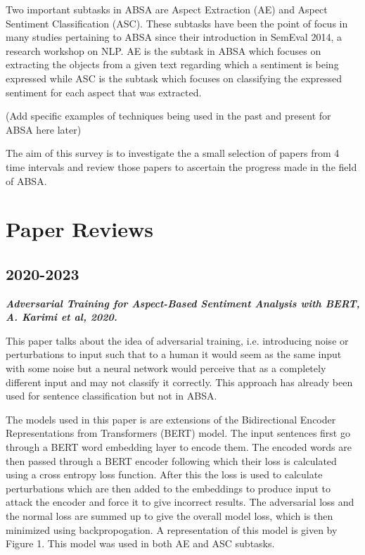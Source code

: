 \documentclass[conference]{IEEEtran}
\begin{document}
Two important subtasks in ABSA are Aspect Extraction (AE) and Aspect Sentiment Classification (ASC). These subtasks have been the point of focus in many studies pertaining to ABSA since their introduction in SemEval 2014, a research workshop on NLP. AE is the subtask in ABSA which focuses on extracting the objects from a given text regarding which a sentiment is being expressed while ASC is the subtask which focuses on classifying the expressed sentiment for each aspect that was extracted.

(Add specific examples of techniques being used in the past and present for ABSA here later)

The aim of this survey is to investigate the a small selection of papers from 4 time intervals and review those papers to ascertain the progress made in the field of ABSA.

\section{Paper Reviews}

\subsection{2020-2023}

\textit{\textbf{Adversarial Training for Aspect-Based Sentiment
Analysis with BERT, A. Karimi et al, 2020.}}

This paper talks about the idea of adversarial training, i.e. introducing noise or perturbations to input such that to a human it would seem as the same input with some noise but a neural network would perceive that as a completely different input and may not classify it correctly. This approach has already been used for sentence classification but not in ABSA.

The models used in this paper is are extensions of the Bidirectional Encoder Representations from Transformers (BERT) model. The input sentences first go through a BERT word embedding layer to encode them. The encoded words are then passed through a BERT encoder following which their loss is calculated using a cross entropy loss function. After this the loss is used to calculate perturbations which are then added to the embeddings to produce input to attack the encoder and force it to give incorrect results. The adversarial loss and the normal loss are summed up to give the overall model loss, which is then minimized using backpropogation. A representation of this model is given by Figure 1. This model was used in both AE and ASC subtasks.
\end{document}
